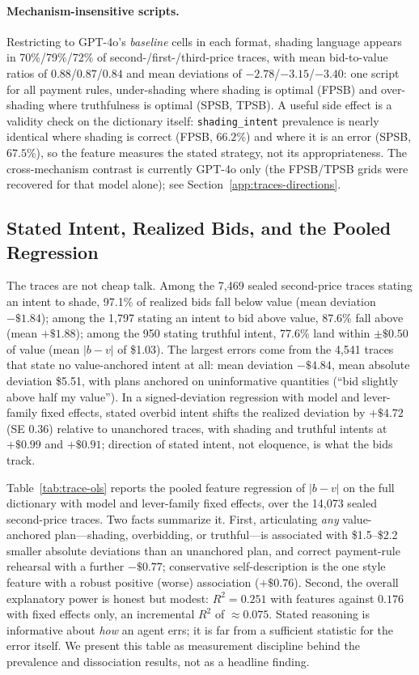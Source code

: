 \paragraph{Mechanism-insensitive scripts.} Restricting to GPT-4o's \emph{baseline} cells in each format, shading language appears in 70\%/79\%/72\% of second-/first-/third-price traces, with mean bid-to-value ratios of $0.88$/$0.87$/$0.84$ and mean deviations of $-2.78$/$-3.15$/$-3.40$: one script for all payment rules, under-shading where shading is optimal (FPSB) and over-shading where truthfulness is optimal (SPSB, TPSB). A useful side effect is a validity check on the dictionary itself: \texttt{shading\_intent} prevalence is nearly identical where shading is correct (FPSB, $66.2\%$) and where it is an error (SPSB, $67.5\%$), so the feature measures the stated strategy, not its appropriateness. The cross-mechanism contrast is currently GPT-4o only (the FPSB/TPSB grids were recovered for that model alone); see Section~\ref{app:traces-directions}.

\subsection{Stated Intent, Realized Bids, and the Pooled Regression}\label{app:traces-ols}

The traces are not cheap talk. Among the 7{,}469 sealed second-price traces stating an intent to shade, 97.1\% of realized bids fall below value (mean deviation $-\$1.84$); among the 1{,}797 stating an intent to bid above value, 87.6\% fall above (mean $+\$1.88$); among the 950 stating truthful intent, 77.6\% land within $\pm\$0.50$ of value (mean $|b-v|$ of \$1.03). The largest errors come from the 4{,}541 traces that state no value-anchored intent at all: mean deviation $-\$4.84$, mean absolute deviation \$5.51, with plans anchored on uninformative quantities (``bid slightly above half my value''). In a signed-deviation regression with model and lever-family fixed effects, stated overbid intent shifts the realized deviation by $+\$4.72$ (SE $0.36$) relative to unanchored traces, with shading and truthful intents at $+\$0.99$ and $+\$0.91$; direction of stated intent, not eloquence, is what the bids track.

Table~\ref{tab:trace-ols} reports the pooled feature regression of $|b-v|$ on the full dictionary with model and lever-family fixed effects, over the 14{,}073 sealed second-price traces. Two facts summarize it. First, articulating \emph{any} value-anchored plan---shading, overbidding, or truthful---is associated with \$1.5--\$2.2 smaller absolute deviations than an unanchored plan, and correct payment-rule rehearsal with a further $-\$0.77$; conservative self-description is the one style feature with a robust positive (worse) association ($+\$0.76$). Second, the overall explanatory power is honest but modest: $R^{2} = 0.251$ with features against $0.176$ with fixed effects only, an incremental $R^{2}$ of $\approx 0.075$. Stated reasoning is informative about \emph{how} an agent errs; it is far from a sufficient statistic for the error itself. We present this table as measurement discipline behind the prevalence and dissociation results, not as a headline finding.

